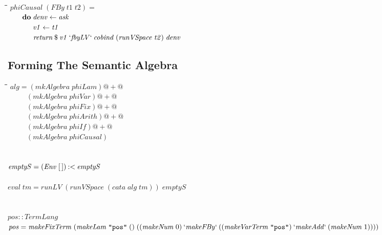 \documentclass[10pt]{article}
\newlength{\lwidth}\setlength{\lwidth}{4.5cm}
\newlength{\cwidth}\setlength{\cwidth}{8mm} %
\newcommand{\Conid}[1]{\mathit{#1}}
\newcommand{\Varid}[1]{\mathit{#1}}
\begin{document}
\begin{tabbing}
\qquad\=\hspace{\lwidth}\=\hspace{\cwidth}\=\+\kill
${\Varid{phiCausal}\;(\Conid{FBy}\;\Varid{t1}\;\Varid{t2})\mathrel{=}}$\\
${\hskip2.00em\relax\mathbf{do}\;\Varid{denv}\leftarrow \Varid{ask}}$\\
${\hskip2.00em\relax\phantom{\mathbf{do}\;\mbox{}}\Varid{v1}\leftarrow \Varid{t1}}$\\
${\hskip2.00em\relax\phantom{\mathbf{do}\;\mbox{}}\Varid{return}\mathbin{\$}\Varid{v1}\mathbin{`\Varid{fbyLV}`}\Varid{cobind}\;(\Varid{runVSpace}\;\Varid{t2})\;\Varid{denv}}$
\end{tabbing}
\subsection{Forming The Semantic Algebra}

\begin{tabbing}
\qquad\=\hspace{\lwidth}\=\hspace{\cwidth}\=\+\kill
${\Varid{alg}\mathrel{=}(\Varid{mkAlgebra}\;\Varid{phiLam})\mathbin{@+@}}$\\
${\phantom{\Varid{alg}\mathrel{=}\mbox{}}(\Varid{mkAlgebra}\;\Varid{phiVar})\mathbin{@+@}}$\\
${\phantom{\Varid{alg}\mathrel{=}\mbox{}}(\Varid{mkAlgebra}\;\Varid{phiFix})\mathbin{@+@}}$\\
${\phantom{\Varid{alg}\mathrel{=}\mbox{}}(\Varid{mkAlgebra}\;\Varid{phiArith})\mathbin{@+@}}$\\
${\phantom{\Varid{alg}\mathrel{=}\mbox{}}(\Varid{mkAlgebra}\;\Varid{phiIf})\mathbin{@+@}}$\\
${\phantom{\Varid{alg}\mathrel{=}\mbox{}}(\Varid{mkAlgebra}\;\Varid{phiCausal})}$\\
${}$\\
${}$\\
${\Varid{emptyS}\mathrel{=}(\Conid{Env}\;[\mskip1.5mu \mskip1.5mu])\mathbin{:<}\Varid{emptyS}}$\\
${}$\\
${\Varid{eval}\;\Varid{tm}\mathrel{=}\Varid{runLV}\;(\Varid{runVSpace}\;(\Varid{cata}\;\Varid{alg}\;\Varid{tm}))\;\Varid{emptyS}}$\\
${}$\\
${}$\\
${\Varid{pos}\mathbin{::}\Conid{TermLang}}$\\
${\Varid{pos}\mathrel{=}\Varid{makeFixTerm}\;(\Varid{makeLam}\;\text{\tt \char34 pos\char34}\;()\;((\Varid{makeNum}\;\mathrm{0})\mathbin{`\Varid{makeFBy}`}((\Varid{makeVarTerm}\;\text{\tt \char34 pos\char34})\mathbin{`\Varid{makeAdd}`}(\Varid{makeNum}\;\mathrm{1}))))}$
\end{tabbing}

\end{document}
